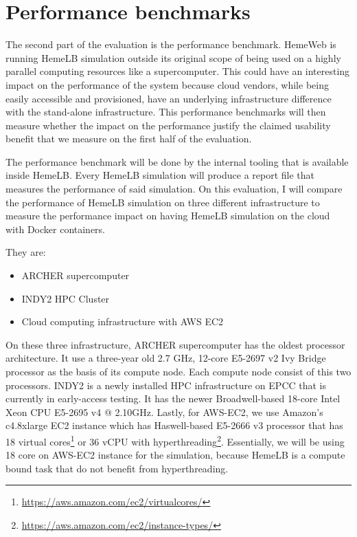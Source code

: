 
\section{Performance benchmarks}

The second part of the evaluation is the performance benchmark. HemeWeb is running HemeLB simulation outside its original scope of being used on a highly parallel computing resources like a supercomputer. This could have an interesting impact on the performance of the system because cloud vendors, while being easily accessible and provisioned, have an underlying infrastructure difference with the stand-alone infrastructure. This performance benchmarks will then measure whether the impact on the performance justify the claimed usability benefit that we measure on the first half of the evaluation.

The performance benchmark will be done by the internal tooling that is available inside HemeLB. Every HemeLB simulation will produce a report file that measures the performance of said simulation. On this evaluation, I will compare the performance of HemeLB simulation on three different infrastructure to measure the performance impact on having HemeLB simulation on the cloud with Docker containers. 

They are:
\begin{itemize}
	\item{ARCHER supercomputer}
	\item{INDY2 HPC Cluster}
	\item{Cloud computing infrastructure with AWS EC2}
\end{itemize}

On these three infrastructure,  ARCHER supercomputer has the oldest processor architecture. It use a three-year old 2.7 GHz, 12-core E5-2697 v2 Ivy Bridge processor as the basis of its compute node. Each compute node consist of this two processors. INDY2 is a newly installed HPC infrastructure on EPCC that is currently in early-access testing. It has the newer Broadwell-based 18-core Intel Xeon CPU E5-2695 v4 @ 2.10GHz. Lastly, for AWS-EC2, we use Amazon's c4.8xlarge EC2 instance which has Haswell-based E5-2666 v3 processor that has 18 virtual cores\footnote{\url{https://aws.amazon.com/ec2/virtualcores/}} or 36 vCPU with hyperthreading\footnote{\url{https://aws.amazon.com/ec2/instance-types/}}. Essentially, we will be using 18 core on AWS-EC2 instance for the simulation, because HemeLB is a compute bound task that do not benefit from hyperthreading. 

